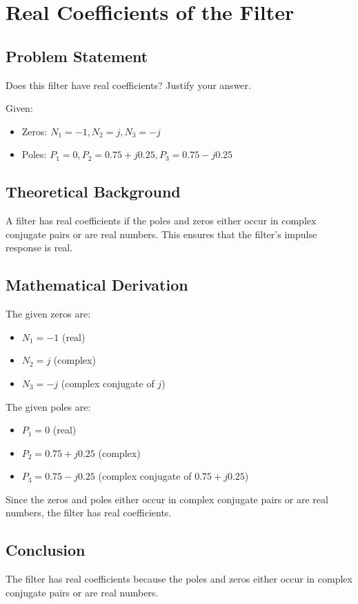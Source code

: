 \item[(a)]
\section{Real Coefficients of the Filter}

\subsection*{Problem Statement}
Does this filter have real coefficients? Justify your answer.

Given:
\begin{itemize}
    \item Zeros: \( N_{1}=-1, N_{2}=j, N_{3}=-j \)
    \item Poles: \( P_{1}=0, P_{2}=0.75+j0.25, P_{3}=0.75-j0.25 \)
\end{itemize}

\subsection*{Theoretical Background}
A filter has real coefficients if the poles and zeros either occur in complex conjugate pairs or are real numbers. This ensures that the filter's impulse response is real.

\subsection*{Mathematical Derivation}
The given zeros are:
\begin{itemize}
    \item \( N_{1} = -1 \) (real)
    \item \( N_{2} = j \) (complex)
    \item \( N_{3} = -j \) (complex conjugate of \( j \))
\end{itemize}

The given poles are:
\begin{itemize}
    \item \( P_{1} = 0 \) (real)
    \item \( P_{2} = 0.75 + j0.25 \) (complex)
    \item \( P_{3} = 0.75 - j0.25 \) (complex conjugate of \( 0.75 + j0.25 \))
\end{itemize}

Since the zeros and poles either occur in complex conjugate pairs or are real numbers, the filter has real coefficients.

\subsection*{Conclusion}
The filter has real coefficients because the poles and zeros either occur in complex conjugate pairs or are real numbers.
